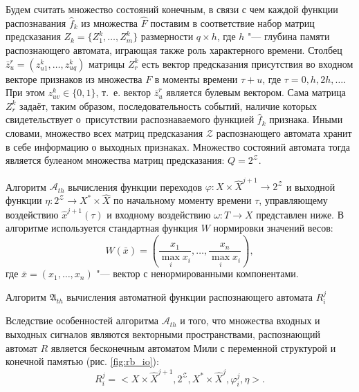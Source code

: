 \documentclass[a4paper, 12pt]{article}
\theoremstyle{plain}
\newcommand{\stretchsize}{2}
\renewcommand{\baselinestretch}{\stretchsize}
\begin{document}
	Будем считать множество состояний конечным, в связи с чем каждой функции распознавания $\hat f_k$ из множества $\hat F$ поставим в соответствие набор матриц предсказания $Z_k=\{Z_1^k,…,Z_m^k\}$ размерности $q\times h$, где $h$ "--- глубина памяти распознающего автомата, играющая также роль характерного времени. Столбец $\bar{z}_u^r=(z_{u1}^k,…,z_{uq}^k)$ матрицы $Z_r^k$ есть вектор предсказания присутствия во входном векторе признаков из множества $F$ в моменты времени $\tau+u$, где $\tau = 0,h,2h,\dots$. При этом $z_{uv}^k\in\{0,1\}$, т.~е. вектор $\bar{z}_u^r$ является булевым вектором. Сама матрица $Z_r^k$ задаёт, таким образом, последовательность событий, наличие которых свидетельствует о~присутствии распознаваемого функцией $\hat f_k$ признака. Иными словами, множество всех матриц предсказания $\mathcal Z$ распознающего автомата хранит в себе информацию о выходных признаках. Множество состояний автомата тогда является булеаном множества матриц предсказания: $Q=2^{\mathcal Z}$.
	
	Алгоритм $\mathcal A_{th}$ вычисления функции переходов $\varphi:X\times\hat X^{j+1}\to 2^{\mathcal Z}$ и выходной функции $\eta:2^{\mathcal Z}\to X^*\times\hat X$ по начальному моменту времени $\tau$, управляющему воздействию $\hat x^{j+1}(\tau)$ и входному воздействию $\omega:T\to X$ представлен ниже. В алгоритме используется стандартная функция $W$ нормировки значений весов:
	\begin{equation}
	W(\bar x)=\left(\frac{x_1}{\max\limits_i x_i},\dots,\frac{x_n}{\max\limits_i x_i}\right),
	\end{equation} 
	где $\bar x=(x_1,\dots,x_n)$ "--- вектор с ненормированными компонентами.

	\renewcommand{\baselinestretch}{1}
	\begin{algorithm}[h]
		\caption{Алгоритм $\mathfrak{A}_{th}$ вычисления автоматной функции распознающего автомата $R_i^j$}\label{alg:automato}
		\begin{algorithmic}[1]
			
			
		\end{algorithmic}
	\end{algorithm}
	\renewcommand{\baselinestretch}{\stretchsize}

	Вследствие особенностей алгоритма $\mathcal A_{th}$ и  того, что множества входных и выходных сигналов являются векторными пространствами, распознающий автомат $R$ является бесконечным автоматом Мили с переменной структурой и конечной памятью (рис. \ref{fig:rb_io}): 
	\begin{equation}
	R_i^j=<X\times\hat X^{j+1}, 2^{\mathcal Z}, X^*\times\hat X^j,\varphi_i^j,\eta>.
	\end{equation}
\end{document}
